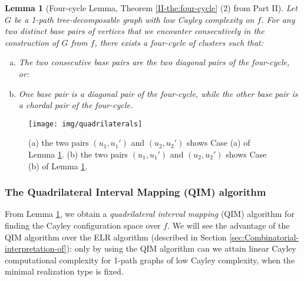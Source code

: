 \documentclass[secthm,amsthm,english]{article}
\newtheorem{lemma}{Lemma}
\theoremstyle{definition}
\theoremstyle{remark}
\begin{document}
\begin{lemma}[Four-cycle Lemma, Theorem \ref{II-the:four-cycle} (2) from Part II] \label{lem:QIM}
Let $G$ be a 1-path tree-decomposable graph with low Cayley complexity on $f$. 
For any two distinct base pairs of vertices that we encounter consecutively in the construction of $G$ from $f$, 
there exists a four-cycle of clusters such that: 

\begin{enumerate}[(a)]
\item The two consecutive base pairs are the two diagonal pairs of the four-cycle, or:

\item One  base pair is a diagonal pair of the four-cycle, while the other base pair is a chordal pair of the four-cycle. 
\end{enumerate}

\end{lemma}







\begin{figure}[h]
	  
	  
	  
	  
	 
	     
	   
	 
	
	\begin{centering}
	\texttt{[image: img/quadrilaterals]} 
	\par\end{centering}
	
	\caption{(a) the two pairs $(u_1,u_1')$ and $(u_2,u_2')$ shows Case (a) of Lemma \ref{lem:QIM}.
	(b) the two pairs $(u_1,u_1')$ and $(u_2,u_2')$ shows Case (b) of Lemma \ref{lem:QIM}.}
\label{F:quadrilaterals} 
\end{figure}

\subsubsection{The Quadrilateral Interval Mapping (QIM) algorithm} \label{sub:QIM}

From Lemma \ref{lem:QIM}, we obtain a \emph{quadrilateral interval mapping }(QIM) algorithm for finding the Cayley configuration space over $f$.
We will see the advantage of the QIM algorithm over the ELR algorithm (described in Section \ref{sec:Combinatorial-interpretation-of}):  
only by using the QIM algorithm can we attain linear Cayley computational complexity for 1-path graphs of low Cayley complexity, 
when the minimal realization type is fixed.
\end{document}

